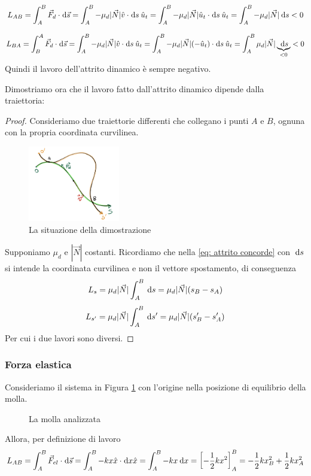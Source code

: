 \documentclass{article}
\theoremstyle{plain}
\begin{document}
\begin{equation}
    \label{eq: attrito  concorde}
    L_{AB} =\int_A^B\vec F_d \cdot \!\:\text{d}\vec s =\int_A^B -\mu_d|\vec N|\hat v\cdot  \!\:\text{d} s\: \hat u_t =\int_A^B -\mu_d|\vec N|\hat u_t\cdot  \!\:\text{d} s\: \hat u_t = \int_A^B -\mu_d|\vec N|\:\text{d} s < 0
\end{equation}

\begin{equation}
    \label{eq: attrito  discorde}
    L_{BA} =\int_B^A\vec F_d \cdot \!\:\text{d}\vec s =\int_A^B -\mu_d|\vec N|\hat v\cdot  \!\:\text{d} s\: \hat u_t =\int_A^B -\mu_d|\vec N|( -\hat u_t)\cdot  \!\:\text{d} s\: \hat u_t = \int_A^B \mu_d|\vec N|\underbrace{\:\text{d} s}_{< 0}< 0
\end{equation}
Quindi il lavoro dell'attrito dinamico è sempre negativo.

Dimostriamo ora che il lavoro fatto dall'attrito dinamico dipende dalla traiettoria:\begin{proof}
    Consideriamo due traiettorie differenti che collegano i punti $A$ e $B$, ognuna con la propria coordinata curvilinea.
    \begin{figure}[h]
        \centering
        \includegraphics[width=4cm]{src/attrito dinamico.png}
        \caption{La situazione della dimostrazione}
    \end{figure}
    Supponiamo $\mu_d$ e $|\vec N|$ costanti. Ricordiamo che nella \eqref{eq: attrito  concorde} con $\:\text{d} s$ si intende la coordinata curvilinea e non il vettore spostamento, di conseguenza
    \[L_s = \mu_d|\vec N|\int_A^B \:\text{d} s =\mu_d|\vec N| (s_B - s_A)\]
    \[L_{s'} = \mu_d|\vec N|\int_A^B \:\text{d} s' =\mu_d|\vec N| (s'_B - s'_A)\]
    Per cui i due lavori sono diversi.
\end{proof}
\subsubsection{Forza elastica}
Consideriamo il sistema in Figura \ref{fig: molla} con l'origine nella posizione di equilibrio della molla. 
\begin{figure}[h]
    \centering
    \caption{La molla analizzata}
    \label{fig: molla}
\end{figure}
Allora, per definizione di lavoro
\[L_{AB} =\int_A^B\vec F_{el}\cdot \!\:\text{d} \vec s =\int_A^B - kx\hat x\cdot \!\:\text{d} x\hat x =\int_A^B - kx\:\text{d} x = \left[ - \frac{1}{2} kx^2\right]_A^B =- \frac{1}{2}kx^2_B + \frac{1}{2}kx^2_A\]
\end{document}
